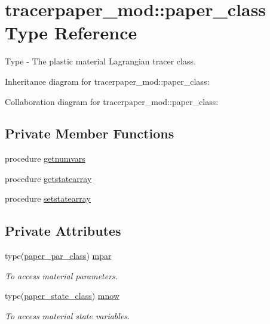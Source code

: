 \hypertarget{structtracerpaper__mod_1_1paper__class}{}\section{tracerpaper\+\_\+mod\+:\+:paper\+\_\+class Type Reference}
\label{structtracerpaper__mod_1_1paper__class}


Type -\/ The plastic material Lagrangian tracer class.  




Inheritance diagram for tracerpaper\+\_\+mod\+:\+:paper\+\_\+class\+:


Collaboration diagram for tracerpaper\+\_\+mod\+:\+:paper\+\_\+class\+:
\subsection*{Private Member Functions}
\begin{DoxyCompactItemize}
\item 
procedure \mbox{\hyperlink{structtracerpaper__mod_1_1paper__class_a0ba29c27901f4604afa1fbf3c0dc3ca8}{getnumvars}}
\item 
procedure \mbox{\hyperlink{structtracerpaper__mod_1_1paper__class_a21d6ed82c83e42c34957d7e7d6013b60}{getstatearray}}
\item 
procedure \mbox{\hyperlink{structtracerpaper__mod_1_1paper__class_aceade1b3528c222d5633f1c7e26df2dc}{setstatearray}}
\end{DoxyCompactItemize}
\subsection*{Private Attributes}
\begin{DoxyCompactItemize}
\item 
type(\mbox{\hyperlink{structtracerpaper__mod_1_1paper__par__class}{paper\+\_\+par\+\_\+class}}) \mbox{\hyperlink{structtracerpaper__mod_1_1paper__class_a26cdff9536d77341f4c2d815400a7a86}{mpar}}
\begin{DoxyCompactList}\small\item\em To access material parameters. \end{DoxyCompactList}\item 
type(\mbox{\hyperlink{structtracerpaper__mod_1_1paper__state__class}{paper\+\_\+state\+\_\+class}}) \mbox{\hyperlink{structtracerpaper__mod_1_1paper__class_a737a7e41a12ed99f6d3deaddc0a07554}{mnow}}
\begin{DoxyCompactList}\small\item\em To access material state variables. \end{DoxyCompactList}\end{DoxyCompactItemize}


